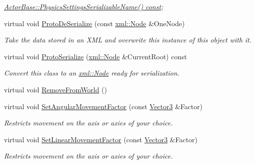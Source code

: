 \begin{DoxyCompactItemize}
\begin{DoxyCompactList}\small\item\em \hyperlink{classMezzanine_1_1ActorBase_a7a18ac81a996e2d68057223ebbc7959c}{ActorBase::PhysicsSettingsSerializableName() const}; \item\end{DoxyCompactList}\item 
virtual void \hyperlink{classMezzanine_1_1ActorRigid_a1b73b6506648f874e7962148d21feecb}{ProtoDeSerialize} (const \hyperlink{classMezzanine_1_1xml_1_1Node}{xml::Node} \&OneNode)
\begin{DoxyCompactList}\small\item\em Take the data stored in an XML and overwrite this instance of this object with it. \item\end{DoxyCompactList}\item 
virtual void \hyperlink{classMezzanine_1_1ActorRigid_ac64f6a903b0741043d2a5995b8ade39f}{ProtoSerialize} (\hyperlink{classMezzanine_1_1xml_1_1Node}{xml::Node} \&CurrentRoot) const 
\begin{DoxyCompactList}\small\item\em Convert this class to an \hyperlink{classMezzanine_1_1xml_1_1Node}{xml::Node} ready for serialization. \item\end{DoxyCompactList}\item 
virtual void \hyperlink{classMezzanine_1_1ActorRigid_a5017e2809d6dc2516b3675748ce80b2e}{RemoveFromWorld} ()
\item 
virtual void \hyperlink{classMezzanine_1_1ActorRigid_ab68facc031fc3212f4169d2b93a72378}{SetAngularMovementFactor} (const \hyperlink{classMezzanine_1_1Vector3}{Vector3} \&Factor)
\begin{DoxyCompactList}\small\item\em Restricts movement on the axis or axies of your choice. \item\end{DoxyCompactList}\item 
virtual void \hyperlink{classMezzanine_1_1ActorRigid_a0dc1820d0fa2d1128b03149da025f40f}{SetLinearMovementFactor} (const \hyperlink{classMezzanine_1_1Vector3}{Vector3} \&Factor)
\begin{DoxyCompactList}\small\item\em Restricts movement on the axis or axies of your choice. \item\end{DoxyCompactList}\end{DoxyCompactItemize}
